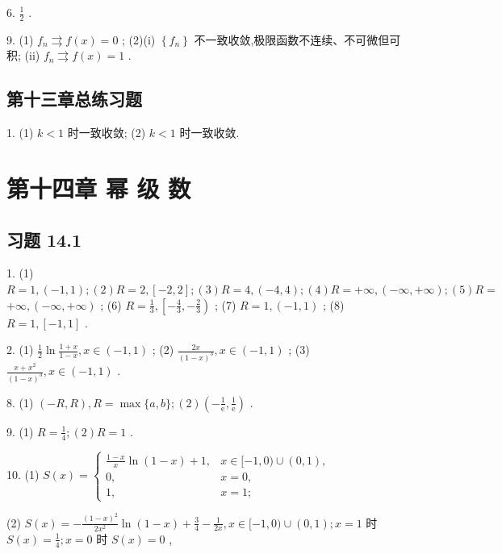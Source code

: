 6. \(\frac{1}{2}\) .

9. (1) \({f}_{n} \rightrightarrows  f\left( x\right)  = 0\) ; (2)(i) \(\left\{  {f}_{n}\right\}\) 不一致收敛,极限函数不连续、不可微但可积; (ii) \({f}_{n} \rightrightarrows  f\left( x\right)  = 1\) .

\subsection{第十三章总练习题}

1. (1) \(k < 1\) 时一致收敛; (2) \(k < 1\) 时一致收敛.

\section{第十四章 幂 级 数}

\subsection{习题 14.1}

1. (1) \(R = 1,\left( {-1,1}\right) ;\left( 2\right) R = 2,\left\lbrack  {-2,2}\right\rbrack  ;\left( 3\right) R = 4,\left( {-4,4}\right) ;\left( 4\right) R =  + \infty ,\left( {-\infty , + \infty }\right) ;\left( 5\right) R =\)  \(+ \infty ,\left( {-\infty , + \infty }\right)\) ; (6) \(R = \frac{1}{3},\left\lbrack  {-\frac{4}{3}, - \frac{2}{3}}\right)\) ; (7) \(R = 1,\left( {-1,1}\right)\) ; (8) \(R = 1,\left\lbrack  {-1,1}\right\rbrack\) .

2. (1) \(\frac{1}{2}\ln \frac{1 + x}{1 - x},x \in  \left( {-1,1}\right)\) ; (2) \(\frac{2x}{{\left( 1 - x\right) }^{3}},x \in  \left( {-1,1}\right)\) ; (3) \(\frac{x + {x}^{2}}{{\left( 1 - x\right) }^{3}},x \in  \left( {-1,1}\right)\) .

8. (1) \(\left( {-R,R}\right) ,R = \max \{ a,b\} ;\left( 2\right) \left( {-\frac{1}{\mathrm{e}},\frac{1}{\mathrm{e}}}\right)\) .

9. (1) \(R = \frac{1}{4};\left( 2\right) R = 1\) .

10. (1) \(S\left( x\right)  = \left\{  \begin{array}{ll} \frac{1 - x}{x}\ln \left( {1 - x}\right)  + 1, & x \in  \lbrack  - 1,0) \cup  \left( {0,1}\right) , \\  0, & x = 0, \\  1, & x = 1; \end{array}\right.\)

(2) \(S\left( x\right)  =  - \frac{{\left( 1 - x\right) }^{2}}{2{x}^{2}}\ln \left( {1 - x}\right)  + \frac{3}{4} - \frac{1}{2x},x \in  \lbrack  - 1,0) \cup  \left( {0,1}\right) ;x = 1\) 时 \(S\left( x\right)  = \frac{1}{4};x = 0\) 时 \(S\left( x\right)  = 0\) ,

